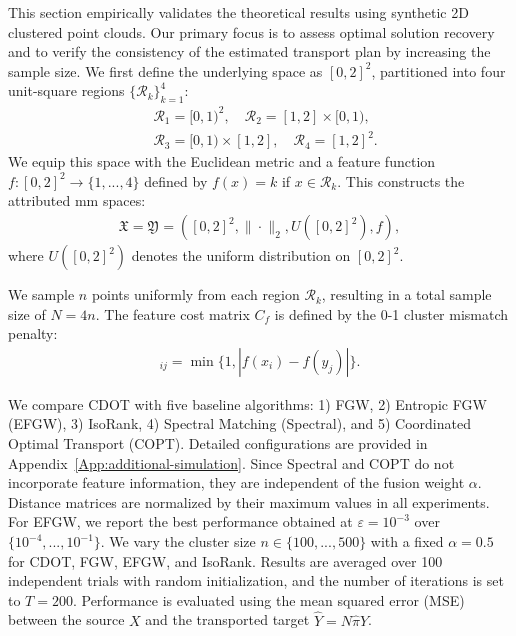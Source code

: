 \documentclass{article}
\theoremstyle{plain}
\theoremstyle{definition}
\theoremstyle{remark}
\begin{document}
This section empirically validates the theoretical results using synthetic 2D clustered point clouds. Our primary focus is to assess optimal solution recovery and to verify the consistency of the estimated transport plan by increasing the sample size.
We first define the underlying space as $[0,2]^2$, partitioned into four unit-square regions $\{\mathcal{R}_k\}_{k=1}^4$:
\begin{align*}
	&\mathcal{R}_1 = [0,1)^2, \quad \mathcal{R}_2 = [1,2] \times [0,1), \\
	&\mathcal{R}_3 = [0,1) \times [1,2], \quad \mathcal{R}_4 = [1,2]^2.
\end{align*}
We equip this space with the Euclidean metric and a feature function $f: [0,2]^2 \to \{1,...,4\}$ defined by $f(x) = k$ if $x \in \mathcal{R}_k$. This constructs the attributed mm spaces:
\begin{align*}
	\mathfrak{X} = \mathfrak{Y} = \left([0,2]^2, \|\cdot\|_2, U([0,2]^2), f\right),
\end{align*}
where $U([0,2]^2)$ denotes the uniform distribution on $[0,2]^2$.

We sample $n$ points uniformly from each region $\mathcal{R}_k$, resulting in a total sample size of $N=4n$. The feature cost matrix $C_f$ is defined by the 0-1 cluster mismatch penalty: 
\begin{align*}
	[C_f]_{ij} = \min\{1, |f(x_i) - f(y_j)| \} .
\end{align*}

We compare CDOT with five baseline algorithms: 1) FGW, 2) Entropic FGW (EFGW), 3) IsoRank, 4) Spectral Matching (Spectral), and 5) Coordinated Optimal Transport (COPT). Detailed configurations are provided in Appendix~\ref{App:additional-simulation}. Since Spectral and COPT do not incorporate feature information, they are independent of the fusion weight $\alpha$. Distance matrices are normalized by their maximum values in all experiments. For EFGW, we report the best performance obtained at $\varepsilon=10^{-3}$ over $\{10^{-4}, ..., 10^{-1}\}$. We vary the cluster size $n \in \{100, ..., 500\}$ with a fixed $\alpha = 0.5$ for CDOT, FGW, EFGW, and IsoRank. Results are averaged over 100 independent trials with random initialization, and the number of iterations is set to $T=200$. Performance is evaluated using the mean squared error (MSE) between the source $X$ and the transported target $\hat{Y} = N \hat{\pi} Y$.
\end{document}
